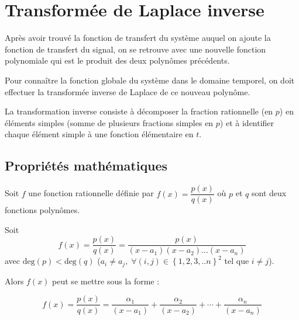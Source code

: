 \documentclass[11pt,oneside]{article}
\begin{document}
\section{Transformée de Laplace inverse}

Après avoir trouvé la fonction de transfert du système auquel on ajoute la
fonction de transfert du signal, on se retrouve avec une nouvelle fonction
polynomiale qui est le produit des deux polynômes précédents. 

Pour connaître la fonction globale du système dans le domaine temporel, on doit
effectuer la transformée inverse de Laplace de ce nouveau polynôme. 

La transformation inverse consiste à décomposer la fraction rationnelle (en $p$)
en éléments simples (somme de plusieurs fractions simples en $p$) et à
identifier chaque élément simple à une fonction élémentaire en $t$.

\subsection{Propriétés mathématiques}
Soit $f$ une fonction rationnelle définie par $f(x)
=\dfrac{p(x)}{q(x)}$ où $p$ et $q$ sont deux fonctions polynômes. 

\begin{prop}
Soit
$$
f(x)=\dfrac{p(x)}{q(x)}=
\dfrac{p(x)}{\left(x-a_1 \right)\left(x-a_2 \right)...\left(x-a_n \right)}
$$
avec $\text{deg}(p)<\text{deg}(q)$ ($a_i\neq a_j,\; \forall (i,j) \in \left\{1,2,3,..n
\right\}^2$ tel que $i\neq j$).

Alors $f(x)$ peut se mettre sous la forme :

$$
f(x)=\dfrac{p(x)}{q(x)}=
\dfrac{\alpha_1}{\left(x-a_1 \right)}
+\dfrac{\alpha_2}{\left(x-a_2 \right)}
+\cdots
+\dfrac{\alpha_n}{\left(x-a_n \right)}
$$

\end{prop}
\end{document}
